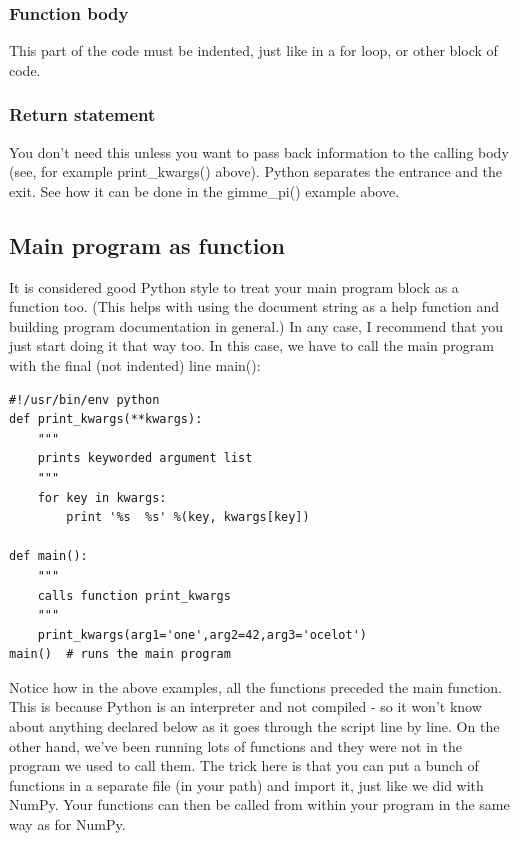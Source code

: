 \documentclass[11pt]{book}
\begin{document}
{ \subsubsection{Function body}
 This part of the code must be indented, just like in a for loop, or other block of code.  
 
 \subsubsection{Return statement}
 You don't need this unless you want to pass back information to the calling body (see, for example {\color{blue}print\_kwargs()} above).  Python separates the entrance and the exit.  See how it can be done in the {\color{blue}gimme\_pi()} example above.    
 
 \subsection{Main program as function}
 
 It is considered good Python style to treat your main program block as a function too.  (This helps with using the document string as a help function and building program documentation in general.)  In any case, I recommend that you just start doing it that way too.  In this case,  we have to call the main program with the final (not indented) line {\color{blue}main()}:

{ \color{blue} \begin{verbatim}
#!/usr/bin/env python
def print_kwargs(**kwargs):
    """
    prints keyworded argument list
    """
    for key in kwargs:
        print '%s  %s' %(key, kwargs[key])
     
def main():
    """
    calls function print_kwargs
    """
    print_kwargs(arg1='one',arg2=42,arg3='ocelot')
main()  # runs the main program
\end{verbatim}}

Notice how in the above examples, all the functions preceded the main function.  This is because Python is an interpreter and not compiled - so it won't know about anything declared below as it goes through the script line by line.   On the other hand, we've been running lots of functions and they were not in the program we used to call them.  The trick here is that 
you can put a bunch of functions in a separate file (in your path) and import it, just like we did with {\color{blue}NumPy}.  Your functions can then be called from within your program  in the same way as for {\color{blue}NumPy}.  

}
\end{document}
